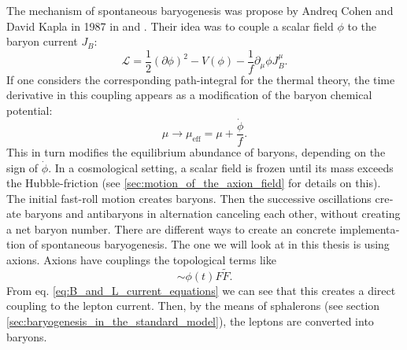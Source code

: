 \documentclass[master,       %
               twoside,        %
               BCOR10mm,       %
               english,ngerman, %
               ]{GAUBM}
\begin{document}
\begin{otherlanguage}{english}
The mechanism of spontaneous baryogenesis was propose by Andreq Cohen and David Kapla in 1987 in \cite{COHEN1987251} and \cite{COHEN1988913}.
Their idea was to couple a scalar field $\phi$ to the baryon current $J_B$:
\begin{equation}
	\mathcal{L} = \frac{1}{2} (\partial \phi)^2 - V(\phi) - \frac{1}{f} \partial_\mu \phi J_B^\mu.
\end{equation}
If one considers the corresponding path-integral for the thermal theory, the time derivative in this coupling appears as a modification of the baryon chemical potential:
\begin{equation}
	\mu \to \mu_\mathrm{eff} = \mu + \frac{\dot{\phi}}{f}.
\end{equation}
This in turn modifies the equilibrium abundance of baryons, depending on the sign of $\dot{\phi}$.
In a cosmological setting, a scalar field is frozen until its mass exceeds the Hubble-friction (see \ref{sec:motion_of_the_axion_field} for details on this). The initial fast-roll motion creates baryons. Then the successive oscillations create baryons and antibaryons in alternation canceling each other, without creating a net baryon number.
There are different ways to create an concrete implementation of spontaneous baryogenesis.
The one we will look at in this thesis is using axions.
Axions have couplings the topological terms like
\begin{equation}
	 \sim \phi(t) F \tilde{F}.
\end{equation}
From eq. \eqref{eq:B_and_L_current_equations} we can see that this creates a direct coupling to the lepton current.
Then, by the means of sphalerons (see section \ref{sec:baryogenesis_in_the_standard_model}), the leptons are converted into baryons.


\end{otherlanguage}
\end{document}
